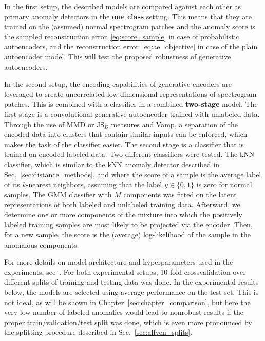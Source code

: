 In the first setup, the described models are compared against each other as primary anomaly detectors in the \textbf{one class} setting. This means that they are trained on the (assumed) normal spectrogram patches and the anomaly score is the sampled reconstruction error~\eqref{eq:score_sample} in case of probabilistic autoencoders, and the reconstruction error~\eqref{eq:ae_objective} in case of the plain autoencoder model. This will test the proposed robustness of generative autoencoders.

In the second setup, the encoding capabilities of generative encoders are leveraged to create uncorrelated low-dimensional representations of spectrogram patches. This is combined with a classifier in a combined \textbf{two-stage} model. The first stage is a convolutional generative autoencoder trained with unlabeled data. Through the use of MMD or $\text{JS}_D$ measures and Vamp, a separation of the encoded data into clusters that contain similar inputs can be enforced, which makes the task of the classifier easier. The second stage is a classifier that is trained on encoded labeled data. Two different classifiers were tested. The kNN classifier, which is similar to the kNN anomaly detector described in Sec.~\ref{sec:distance_methods}, and where the score of a sample is the average label of its $k$-nearest neighbors, assuming that the label $y \in \lbrace 0,1 \rbrace$ is zero for normal samples. The GMM classifier with $M$ components was fitted on the latent representations of both labeled and unlabeled training data. Afterward, we determine one or more components of the mixture into which the positively labeled training samples are most likely to be projected via the encoder. Then, for a new sample, the score is the (average) log-likelihood of the sample in the anomalous components. 

For more details on model architecture and hyperparameters used in the experiments, see~\cite{vskvara2020detection}. For both experimental setups, 10-fold crossvalidation over different splits of training and testing data was done. In the experimental results below, the models are selected using average performance on the test set. This is not ideal, as will be shown in Chapter~\ref{sec:chapter_comparison}, but here the very low number of labeled anomalies would lead to nonrobust results if the proper train/validation/test split was done, which is even more pronounced by the splitting procedure described in Sec.~\ref{sec:alfven_splits}.

